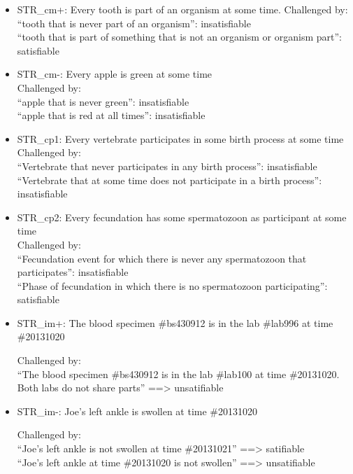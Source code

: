 \begin{itemize}
\item STR\_cm+: Every tooth is part of an organism at some time. Challenged by: \\ ``tooth that is never part of an organism'': insatisfiable \\
``tooth that is part of something that is not an organism or organism part'': satisfiable 


\item STR\_cm-: Every apple is green at some time
\\
Challenged by: \\ ``apple that is never green'': insatisfiable \\
``apple that is red at all times'': insatisfiable 


\item STR\_cp1: Every vertebrate participates in some birth process at some time\\
Challenged by: \\ ``Vertebrate that never participates in any birth process'': insatisfiable \\
``Vertebrate that at some time does not participate in a birth process'': insatisfiable 



\item STR\_cp2: Every fecundation has some spermatozoon as participant at some time
\\
Challenged by: \\ ``Fecundation event for which there is never any spermatozoon that participates'': insatisfiable \\
``Phase of fecundation in which there is no spermatozoon participating'': satisfiable 




\item STR\_im+: The blood specimen \#bs430912 is in the lab \#lab996 at time \#20131020

Challenged by: \\ ``The blood specimen \#bs430912 is in the lab \#lab100 at time \#20131020. Both labs do not share parts'' ==> unsatifiable



\item STR\_im-: Joe's left ankle is swollen at time \#20131020

Challenged by: \\ ``Joe's left ankle is not swollen at time \#20131021'' ==> satifiable
\\ ``Joe's left ankle at time \#20131020 is not swollen'' ==> unsatifiable




\end{itemize}
